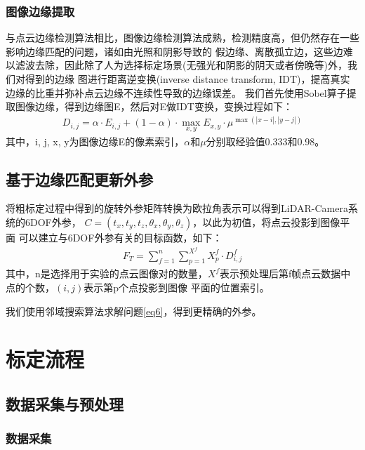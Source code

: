 \subsubsection{图像边缘提取}
与点云边缘检测算法相比，图像边缘检测算法成熟，检测精度高，但仍然存在一些影响边缘匹配的问题，诸如由光照和阴影导致的
假边缘、离散孤立边，这些边难以滤波去除，因此除了人为选择标定场景(无强光和阴影的阴天或者傍晚等)外，我们对得到的边缘
图进行距离逆变换(inverse distance transform, IDT)，提高真实边缘的比重并弥补点云边缘不连续性导致的边缘误差。
我们首先使用Sobel算子提取图像边缘，得到边缘图E，然后对E做IDT变换，变换过程如下：
\begin{equation}
\begin{aligned}
D_{i,j}=\alpha \cdot E_{i,j}+(1-\alpha)\cdot \max \limits_{x,y} E_{x,y}
\cdot \mu^{\max(|x-i|,|y-j|)} 
\end{aligned}
\end{equation}
其中，i, j, x, y为图像边缘E的像素索引，$\alpha$和$\mu$分别取经验值0.333和0.98。

\subsection{基于边缘匹配更新外参}
将粗标定过程中得到的旋转外参矩阵转换为欧拉角表示可以得到LiDAR-Camera系统的6DOF外参，
$C=(t_{x},t_{y},t_{z},\theta_{x},\theta_{y},\theta_{z})$，以此为初值，将点云投影到图像平面
可以建立与6DOF外参有关的目标函数，如下：
\begin{equation}\label{eq6}
\begin{aligned}
F_T=\sum_{f=1}^{n} \sum_{p=1}^{X^{f}} X_{p}^{f}\cdot D_{i,j}^{f}
\end{aligned}
\end{equation}
其中，n是选择用于实验的点云图像对的数量，$X^{f}$表示预处理后第f帧点云数据中点的个数，$(i,j)$表示第p个点投影到图像
平面的位置索引。

我们使用邻域搜索算法求解问题\eqref{eq6}，得到更精确的外参。

\section{标定流程}
\label{sec:3}

\subsection{数据采集与预处理}
\subsubsection{数据采集}

